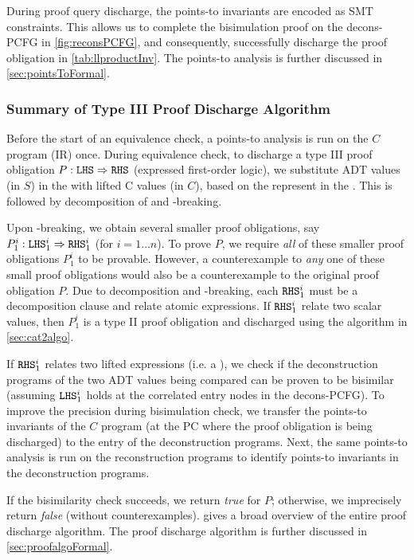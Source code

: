 During proof query discharge, the points-to invariants are encoded as SMT constraints.
This allows us to complete the bisimulation proof on the decons-PCFG in \cref{fig:reconsPCFG},
and consequently, successfully discharge the proof obligation
in \cref{tab:llproductInv}.
The points-to analysis is further discussed in \cref{sec:pointsToFormal}.

\subsubsection{Summary of Type III Proof Discharge Algorithm}
\label{sec:cat3summary}

Before the start of an equivalence check, a points-to analysis is run on the $C$ program (IR) once.
During equivalence check, to discharge a type III proof obligation $P: {\tt LHS}{} \Rightarrow {\tt RHS}{}$
(expressed first-order logic), we substitute ADT values (in $S$) in the \rhs{} with
lifted C values (in $C$), based on the \recursiveRelations{} represent in the \lhs{}.
This is followed by decomposition of \rhs{} and \rhs{}-breaking.

Upon \rhs{}-breaking, we obtain several smaller proof obligations,
say $P_1^i : {\tt LHS}{}_1^i \Rightarrow {\tt RHS}{}_1^i$ (for $i=1\ldots n$).
To prove $P$, we require {\em all} of these smaller proof obligations $P_1^i$ to be provable.
However, a counterexample to {\em any} one of these small proof obligations would also be
a counterexample to the original proof obligation $P$.
Due to decomposition and \rhs{}-breaking, each ${\tt RHS}{}_1^i$ must be a decomposition clause
and relate atomic expressions.
If ${\tt RHS}{}_1^i$ relate two scalar values, then $P_1^i$ is a type II proof obligation and
discharged using the algorithm in \cref{sec:cat2algo}.

If ${\tt RHS}{}_1^i$ relates two lifted expressions (i.e. a \recursiveRelation{}),
we check if the deconstruction programs of the two ADT values being compared
can be proven to be bisimilar (assuming ${\tt LHS}{}_1^i$ holds at the correlated entry nodes
in the decons-PCFG).
To improve the precision during bisimulation check, we transfer the points-to invariants of the $C$
program (at the PC where the proof obligation is being discharged) to the entry of the
deconstruction programs. Next, the same points-to analysis is run on the reconstruction
programs to identify points-to invariants in the deconstruction programs.

If the bisimilarity check succeeds, we return {\em true} for $P$;
otherwise, we imprecisely return {\em false} (without counterexamples).
 gives a broad overview of the entire proof discharge algorithm.
The proof discharge algorithm is further discussed in \cref{sec:proofalgoFormal}.


